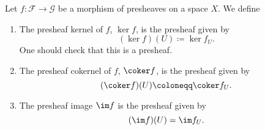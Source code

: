 Let $f\colon \mathcal{F} \to \mathcal{G}$ be a morphism of presheaves on a space
$X$. We define
\begin{enumerate}
	\item The presheaf kernel of $f$, $\ker f$, is the presheaf given by
		\[ (\ker f)(U)\coloneqq \ker f_U. \]
		One should check that this is a presheaf.

	\item The presheaf cokernel of $f$, $\coker f$, is the presheaf given by
		\[ (\coker f)(U)\coloneqq \coker f_U. \]

	\item The presheaf image $\im f$ is the presheaf given by
		\[ (\im f)(U) = \im f_U. \]
\end{enumerate}
